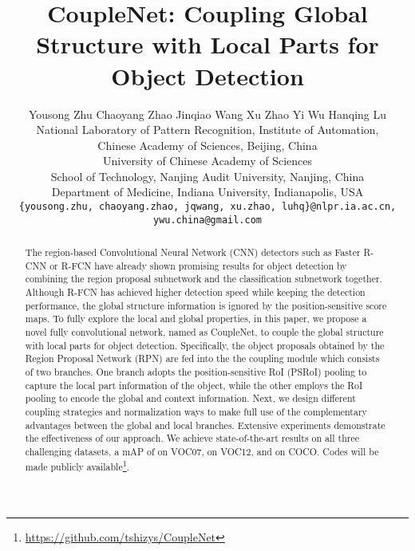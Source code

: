 \documentclass[10pt,twocolumn,letterpaper]{article}
\begin{document}
\title{CoupleNet: Coupling Global Structure with Local Parts for Object Detection}

\author{Yousong Zhu{} \quad Chaoyang Zhao{} \quad Jinqiao Wang{} \quad Xu Zhao{} \quad Yi Wu{} \quad Hanqing Lu{}\\
{}National Laboratory of Pattern Recognition, Institute of Automation, \\Chinese Academy of Sciences, Beijing, China\\
{}University of Chinese Academy of Sciences\\
{}School of Technology, Nanjing Audit University, Nanjing, China\\
{}Department of Medicine, Indiana University, Indianapolis, USA\\
{\tt\small \{yousong.zhu, chaoyang.zhao, jqwang, xu.zhao, luhq\}@nlpr.ia.ac.cn, ywu.china@gmail.com}
}




\maketitle



\begin{abstract}

  The region-based Convolutional Neural Network (CNN) detectors such as Faster R-CNN or R-FCN have already shown promising results for object detection by combining the region proposal subnetwork and the classification subnetwork together. Although R-FCN has achieved higher detection speed while keeping the detection performance, the global structure information is ignored by the position-sensitive score maps. To fully explore the local and global properties, in this paper, we propose a novel fully convolutional network, named as CoupleNet, to couple the global structure with local parts for object detection. Specifically, the object proposals obtained by the Region Proposal Network (RPN) are fed into the the coupling module which consists of two branches. One branch adopts the position-sensitive RoI (PSRoI) pooling to capture the local part information of the object, while the other employs the RoI pooling to encode the global and context information. Next, we design different coupling strategies and normalization ways to make full use of the complementary advantages between the global and local branches. Extensive experiments demonstrate the effectiveness of our approach. We achieve state-of-the-art results on all three challenging datasets, \ie a mAP of  on VOC07,  on VOC12, and  on COCO.
  Codes will be made publicly available\footnote {\url{https://github.com/tshizys/CoupleNet}}.
\end{abstract}
\end{document}
